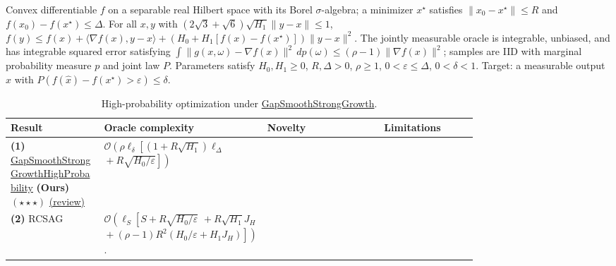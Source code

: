 \begin{table}[tp]
\centering
\caption{High-probability optimization under \href{https://github.com/k3nfalt/longtails/blob/main/LongTails/Setups/GapSmoothStrongGrowth.lean}{GapSmoothStrongGrowth}.}\label{tab:GapSmoothStrongGrowth}
\parbox{\linewidth}{\footnotesize Convex differentiable $f$ on a separable real Hilbert space with its Borel $\sigma$-algebra; a minimizer $x^\star$ satisfies $\|x_0-x^\star\|\le R$ and $f(x_0)-f(x^\star)\le\Delta$. For all $x,y$ with $(2\sqrt3+\sqrt6)\sqrt{H_1}\|y-x\|\le1$, $f(y)\le f(x)+\langle\nabla f(x),y-x\rangle+(H_0+H_1[f(x)-f(x^\star)])\|y-x\|^2$. The jointly measurable oracle is integrable, unbiased, and has integrable squared error satisfying $\int\|g(x,\omega)-\nabla f(x)\|^2\,dp(\omega)\le(\rho-1)\|\nabla f(x)\|^2$; samples are IID with marginal probability measure $p$ and joint law $P$. Parameters satisfy $H_0,H_1\ge0$, $R,\Delta>0$, $\rho\ge1$, $0<\varepsilon\le\Delta$, $0<\delta<1$. Target: a measurable output $\widehat x$ with $P(f(\widehat x)-f(x^\star)>\varepsilon)\le\delta$.}\par\smallskip
\begin{threeparttable}
\footnotesize
\setlength{\tabcolsep}{4pt}\renewcommand{\arraystretch}{1.25}
\begin{tabularx}{\linewidth}{@{}>{\raggedright\arraybackslash}p{0.20\linewidth}>{\raggedright\arraybackslash}p{0.32\linewidth}>{\raggedright\arraybackslash}p{0.25\linewidth}>{\raggedright\arraybackslash}X@{}}
\toprule
\textbf{Result} & \textbf{Oracle complexity} & \textbf{Novelty} & \textbf{Limitations} \\
\midrule
\textbf{(1)} \href{https://github.com/k3nfalt/longtails/blob/main/LongTails/Theorems/GapSmoothStrongGrowthHighProbability.lean}{Gap\allowbreak Smooth\allowbreak Strong\allowbreak Growth\allowbreak High\allowbreak Probability} \textbf{(Ours)} $(\star\star\star)$ \href{https://github.com/k3nfalt/longtails/blob/main/scripts/reviews/GapSmoothStrongGrowthHighProbability.md}{(review)}
& $\mathcal{O}\!\left(\rho\ell_\delta\left[(1+R\sqrt{H_1})\ell_\Delta\right.\right.$\newline
$\left.\left.{}+R\sqrt{H_0/\varepsilon}\right]\right)$
& & \\
\midrule[1.2pt]
\textbf{(2)} RCSAG \citep[Thm.~9, v1]{gssgLobanov2026}
& $\mathcal{O}\!\left(\ell_S\left[S+R\sqrt{H_0/\varepsilon}\right.\right.$\newline
\({}+R\sqrt{H_1}J_H\)\newline
$\left.\left.{}+(\rho-1)R^2(H_0/\varepsilon+H_1J_H)\right]\right)$.\par

\end{tabularx}
\end{threeparttable}
\end{table}
